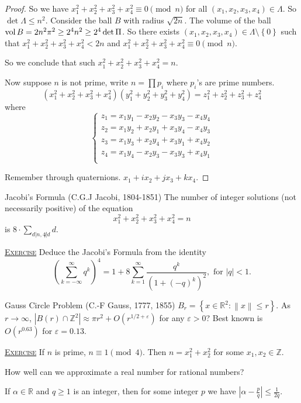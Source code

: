 \documentclass{report}
\newcommand{\R}{\mathbb{R}}
\newcommand{\Z}{\mathbb{Z}}
\newcommand{\norm}[1]{\left\| #1 \right\|}
\newcommand{\set}[1]{\left\{ #1 \right\}}
\newcommand{\fancyem}[1]{\underline{\textsc{#1}}}
\theoremstyle{definition}
\theoremstyle{remark}
\numberwithin{equation}{section}
\begin{document}
\begin{proof}
    So we have $x_1^2 + x_2^2 + x_3^2 + x_4^2 \equiv 0 \pmod{n}$ for all $(x_1, x_2, x_3, x_4) \in \Lambda$. So $\det \Lambda \leq n^2$. Consider the ball $B$ with radius $\sqrt{2n}$. The volume of the ball $\operatorname{vol} B = 2n^2\pi^2 \geq 2^4 n^2 \geq 2^4 \det \Pi$. So there exists $(x_1, x_2, x_3, x_4) \in \Lambda \setminus \set{0}$ such that $x_1^2 + x_2^2 + x_3^2 + x_4^2 < 2n$ and $x_1^2 + x_2^2 + x_3^2 + x_4^2 \equiv 0 \pmod{n}$.

    So we conclude that such $x_1^2 + x_2^2 + x_3^2 + x_4^2 = n$.

    Now suppose $n$ is not prime, write $n = \prod p_i$ where $p_i$'s are prime numbers. \[(x_1^2 + x_2^2 + x_3^2 + x_4^2)(y_1^2 + y_2^2 + y_3^2 + y_4^2) = z_1^2 + z_2^2 + z_3^2 + z_4^2\] where \[\begin{cases}
        z_1 = x_1y_1 - x_2y_2 - x_3y_3 - x_4y_4 \\
        z_2 = x_1y_2 + x_2y_1 + x_3y_4 - x_4y_3 \\
        z_3 = x_1y_3 + x_2y_4 + x_3y_1 + x_4y_2 \\
        z_4 = x_1y_4 - x_2y_3 - x_3y_3 + x_4y_1 \\
    \end{cases}\]

    Remember through quaternions. $x_1 + ix_2 + jx_3 + kx_4$.
\end{proof}

Jacobi's Formula (C.G.J Jacobi, 1804-1851)
The number of integer solutions (not necessarily positive) of the equation \[x_1^2 + x_2^2 + x_3^2 + x_4^2 = n\] is $8 \cdot \sum_{d | n, 4 \not| d} d$.

\fancyem{Exercise} Deduce the Jacobi's Formula from the identity \[
  \left(\sum_{k=-\infty}^\infty q^k\right)^4 = 1 + 8\sum_{k=1}^\infty \frac{q^k}{\left(1 + (-q)^k\right)^2}, \text{ for } |q| < 1.
\]

Gauss Circle Problem (C.-F Gauss, 1777, 1855)
$B_r = \set{x \in \R^2: \norm{x} \leq r}$. As $r \to \infty$, $|B(r) \cap \Z^2| \approx \pi r^2 + O(r^{1/2 + \varepsilon})$ for any $\varepsilon > 0$? Best known is $O(r^{0.63})$ for $\varepsilon = 0.13$.

\fancyem{Exercise} If $n$ is prime, $n \equiv 1 \pmod{4}$. Then $n = x_1^2 + x_2^2$ for some $x_1, x_2 \in \Z$.

How well can we approximate a real number for rational numbers?

If $\alpha \in \R$ and $q \geq 1$ is an integer, then for some integer $p$ we have $\left|\alpha - \frac{p}{q}\right| \leq \frac{1}{2q}$.
\end{document}
